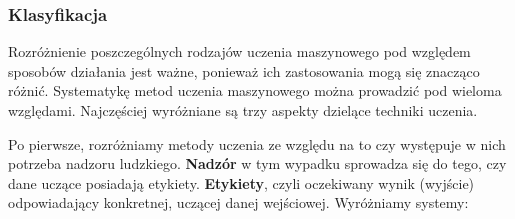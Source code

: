 \subsubsection{Klasyfikacja}

Rozróżnienie poszczególnych rodzajów uczenia maszynowego pod względem sposobów działania jest ważne, ponieważ ich zastosowania mogą się znacząco różnić. Systematykę metod uczenia maszynowego można prowadzić pod wieloma względami. Najczęściej wyróżniane są trzy aspekty dzielące techniki uczenia.

Po pierwsze, rozróżniamy metody uczenia ze względu na to czy występuje w nich potrzeba nadzoru ludzkiego. \textbf{Nadzór} w tym wypadku sprowadza się do tego, czy dane uczące posiadają etykiety. \textbf{Etykiety}, czyli oczekiwany wynik (wyjście) odpowiadający konkretnej, uczącej danej wejściowej. Wyróżniamy systemy:

